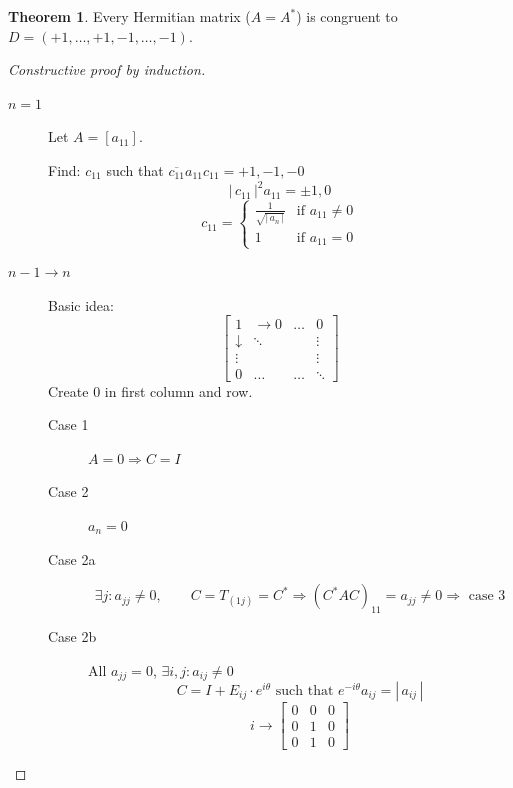 \documentclass[a4paper,landscape,twocolumn]{article}
\newcommand\abs[1]{|\,#1\,|}
\theoremstyle{definition}
\newtheorem{theorem}{Theorem}
\begin{document}
\begin{theorem}
  \label{theorem-8.24}
  Every Hermitian matrix ($A = A^*$) is congruent to $D = (+1, \ldots, +1,-1, \ldots, -1)$.
\end{theorem}
\begin{proof}[Constructive proof by induction]
  \begin{description}
    \item[$n=1$]
      Let $A = [a_{11}]$.

      Find: $c_{11}$ such that $\overline{c_{11}} a_{11} c_{11} = +1,-1,-0$
      \[ \abs{c_{11}}^2 a_{11} = \pm 1, 0 \]
      \[
        c_{11} = \begin{cases}
          \frac1{\sqrt{\abs{a_n}}} & \text{if } a_{11} \neq 0 \\
          1 & \text{if } a_{11} = 0
        \end{cases}
      \]
    \item[$n-1 \to n$]
      Basic idea:
      \[
        \begin{bmatrix}
          1 & \to 0 & \ldots & 0 \\
          \downarrow & \ddots &  & \vdots \\
          \vdots &  &  & \vdots \\
          0 & \ldots & \ldots & \ddots
        \end{bmatrix}
      \]
      Create $0$ in first column and row.

      \begin{description}
        \item[Case 1]
          $A = 0 \Rightarrow C = I$
        \item[Case 2]
          $a_n = 0$
        \item[Case 2a]
          \[
            \exists j: a_{jj} \neq 0, \qquad C = T_{(1j)} = C^*
            \Rightarrow (C^* A C)_{11}
            = a_{jj} \neq 0
            \Rightarrow \text{ case 3}
          \]
        \item[Case 2b]
          All $a_{jj} = 0$, $\exists i,j: a_{ij} \neq 0$
          \[ C = I + E_{ij} \cdot e^{i\theta} \text{ such that } e^{-i\theta} a_{ij} = \abs{a_{ij}} \]
          \[ i \to \begin{bmatrix} 0 & 0 & 0 \\ 0 & 1 & 0 \\ 0 & 1 & 0 \end{bmatrix} \]


\end{description}
\end{description}
\end{proof}
\end{document}
